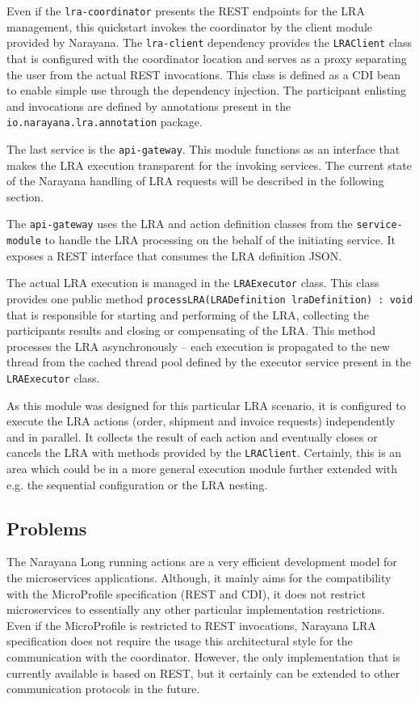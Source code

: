 \documentclass[oneside,
  digital, %
  table,   %
  nolof,     %
  nolot,     %
]{fithesis3}
\begin{document}
Even if the \texttt{lra-coordinator} presents the REST endpoints for the LRA management, this quickstart invokes the coordinator by the client module provided by Narayana. The \texttt{lra-client} dependency provides the \texttt{LRAClient} class that is configured with the coordinator location and serves as a proxy separating the user from the actual REST invocations. This class is defined as a CDI bean to enable simple use through the dependency injection. The participant enlisting and invocations are defined by annotations present in the \texttt{io.narayana.lra.annotation} package.

The last service is the \texttt{api-gateway}. This module functions as an interface that makes the LRA execution transparent for the invoking services. The current state of the Narayana handling of LRA requests will be described in the following section.

The \texttt{api-gateway} uses the LRA and action definition classes from the \texttt{service-module} to handle the LRA processing on the behalf of the initiating service. It exposes a REST interface that consumes the LRA definition JSON.

The actual LRA execution is managed in the \texttt{LRAExecutor} class. This class provides one public method \texttt{processLRA(LRADefinition lraDefinition) : void} that is responsible for starting and performing of the LRA, collecting the participants results and closing or compensating of the LRA. This method processes the LRA asynchronously -- each execution is propagated to the new thread from the cached thread pool defined by the executor service present in the \texttt{LRAExecutor} class.

As this module was designed for this particular LRA scenario, it is configured to execute the LRA actions (order, shipment and invoice requests) independently and in parallel. It collects the result of each action and eventually closes or cancels the LRA with methods provided by the \texttt{LRAClient}. Certainly, this is an area which could be in a more general execution module further extended with e.g. the sequential configuration or the LRA nesting.

\subsection{Problems}

The Narayana Long running actions are a very efficient development model for the microservices applications. Although, it mainly aims for the compatibility with the MicroProfile specification (REST and CDI), it does not restrict microservices to essentially any other particular implementation restrictions. Even if the MicroProfile is restricted to REST invocations, Narayana LRA specification does not require the usage this architectural style for the communication with the coordinator. However, the only implementation that is currently available is based on REST, but it certainly can be extended to other communication protocols in the future.
\end{document}
